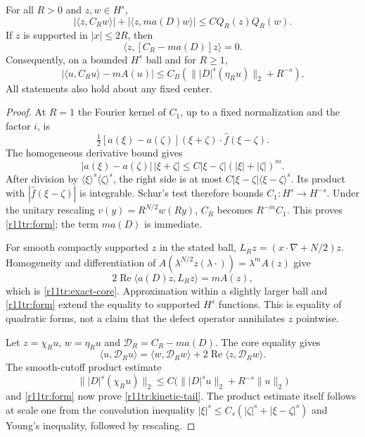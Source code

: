 \begin{lemma}
\label{lem:r11tr-core}
For all $R>0$ and $z,w\in H^s$,
\begin{equation}\label{r11tr:form}
 |\langle z,C_Rw\rangle|+
 |\langle z,ma(D)w\rangle|\le C Q_R(z)Q_R(w).
\end{equation}
If $z$ is supported in $|x|\le2R$, then
\begin{equation}\label{r11tr:exact-core}
 \langle z,[C_R-ma(D)]z\rangle=0.
\end{equation}
Consequently, on a bounded $H^s$ ball and for $R\ge1$,
\begin{equation}\label{r11tr:kinetic-tail}
 \left|\langle u,C_Ru\rangle-mA(u)\right|
 \le C_B\left(\||D|^s(\eta_Ru)\|_2+R^{-s}\right).
\end{equation}
All statements also hold about any fixed center.
\end{lemma}
\begin{proof}
At $R=1$ the Fourier kernel of $C_1$, up to a fixed normalization and
the factor $i$, is
\[
 \tfrac12[a(\xi)-a(\zeta)](\xi+\zeta)\cdot
                   \widehat f(\xi-\zeta).
\]
The homogeneous derivative bound gives
\[
 |a(\xi)-a(\zeta)|\,|\xi+\zeta|
 \le C|\xi-\zeta|(|\xi|+|\zeta|)^m.
\]
After division by $\langle\xi\rangle^s\langle\zeta\rangle^s$,
the right side is at most
$C|\xi-\zeta|\langle\xi-\zeta\rangle^s$. Its product with
$|\widehat f(\xi-\zeta)|$ is integrable. Schur's test therefore
bounds $C_1:H^s\to H^{-s}$. Under the unitary rescaling
$v(y)=R^{N/2}w(Ry)$, $C_R$ becomes $R^{-m}C_1$.
This proves \eqref{r11tr:form}; the term $ma(D)$ is immediate.

For smooth compactly supported $z$ in the stated ball,
$L_Rz=(x\cdot\nabla+N/2)z$. Homogeneity and differentiation of
$A(\lambda^{N/2}z(\lambda\cdot))=\lambda^mA(z)$ give
\[
 2\operatorname{Re}\langle a(D)z,L_Rz\rangle=mA(z),
\]
which is \eqref{r11tr:exact-core}. Approximation within a slightly
larger ball and \eqref{r11tr:form} extend the equality to supported
$H^s$ functions. This is equality of quadratic forms, not a claim
that the defect operator annihilates $z$ pointwise.

Let $z=\chi_Ru$, $w=\eta_Ru$ and $\mathcal D_R=C_R-ma(D)$.
The core equality gives
\[
 \langle u,\mathcal D_Ru\rangle
 =\langle w,\mathcal D_Rw\rangle
       +2\operatorname{Re}\langle z,\mathcal D_Rw\rangle.
\]
The smooth-cutoff product estimate
\[
 \||D|^s(\chi_Ru)\|_2
 \le C\bigl(\||D|^su\|_2+R^{-s}\|u\|_2\bigr)
\]
and \eqref{r11tr:form} now prove \eqref{r11tr:kinetic-tail}.
The product estimate itself follows at scale one from the convolution
inequality $|\xi|^s\le C_s(|\zeta|^s+|\xi-\zeta|^s)$ and Young's
inequality, followed by rescaling.
\end{proof}

